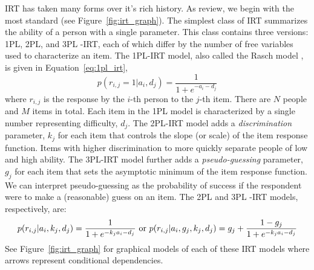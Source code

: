 IRT has taken many forms over it's rich history. As review, we begin with the most standard (see Figure~\ref{fig:irt_graph}).
The simplest class of IRT summarizes the ability of a person with a single parameter.
This class contains three versions: 1PL, 2PL, and 3PL -IRT, each of which differ by the number of free variables used to characterize an item.
The 1PL-IRT model, also called the Rasch model \cite{rasch1960studies}, is given in Equation~\ref{eq:1pl_irt},
\begin{equation}
    p(r_{i,j}=1|a_i,d_j) = \frac{1}{1 + e^{-a_i - d_j}}
\label{eq:1pl_irt}
\end{equation}
where $r_{i,j}$ is the response by the $i$-th person to the $j$-th item.
There are $N$ people and $M$ items in total.
Each item in the 1PL model is characterized by a single number representing difficulty, $d_j$.
The 2PL-IRT model adds a \textit{discrimination} parameter, $k_j$ for each item that controls the slope (or scale) of the item response function. 
Items with higher discrimination to more quickly separate people of low and high ability.
The 3PL-IRT model further adds a \textit{pseudo-guessing} parameter, $g_j$ for each item that sets the asymptotic minimum of the item response function.
We can interpret pseudo-guessing as the probability of success if the respondent were to make a (reasonable) guess on an item.
The 2PL and 3PL -IRT models, respectively, are:
\begin{equation}
   p(r_{i,j}|a_i, k_j, d_j) = \frac{1}{1 + e^{-k_j a_i - d_j}} \textup{ or } p(r_{i,j} | a_i, g_j, k_j, d_j) = g_j + \frac{1 - g_j}{1 + e^{-k_j a_i - d_j}}
\label{eq:2and3pl_irt}
\end{equation}
See Figure~\ref{fig:irt_graph} for graphical models of each of these IRT models where arrows represent conditional dependencies. 

